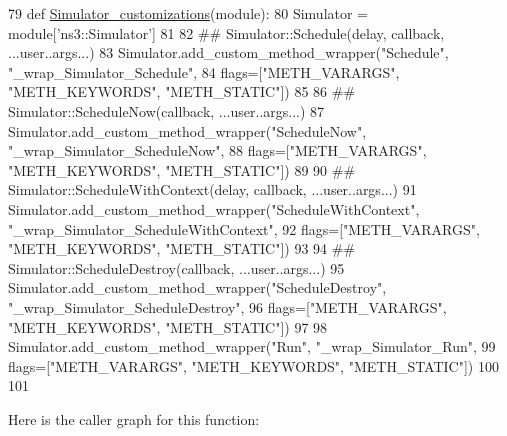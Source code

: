 \begin{DoxyCode}
79 \textcolor{keyword}{def }\hyperlink{namespacemodulegen__customizations_afb127c0333e2c1a8f1df9e5d0970ceea}{Simulator\_customizations}(module):
80     Simulator = module[\textcolor{stringliteral}{'ns3::Simulator'}]
81 
82     \textcolor{comment}{## Simulator::Schedule(delay, callback, ...user..args...)}
83     Simulator.add\_custom\_method\_wrapper(\textcolor{stringliteral}{"Schedule"}, \textcolor{stringliteral}{"\_wrap\_Simulator\_Schedule"},
84                                         flags=[\textcolor{stringliteral}{"METH\_VARARGS"}, \textcolor{stringliteral}{"METH\_KEYWORDS"}, \textcolor{stringliteral}{"METH\_STATIC"}])
85 
86     \textcolor{comment}{## Simulator::ScheduleNow(callback, ...user..args...)}
87     Simulator.add\_custom\_method\_wrapper(\textcolor{stringliteral}{"ScheduleNow"}, \textcolor{stringliteral}{"\_wrap\_Simulator\_ScheduleNow"},
88                                         flags=[\textcolor{stringliteral}{"METH\_VARARGS"}, \textcolor{stringliteral}{"METH\_KEYWORDS"}, \textcolor{stringliteral}{"METH\_STATIC"}])
89 
90     \textcolor{comment}{## Simulator::ScheduleWithContext(delay, callback, ...user..args...)}
91     Simulator.add\_custom\_method\_wrapper(\textcolor{stringliteral}{"ScheduleWithContext"}, \textcolor{stringliteral}{"\_wrap\_Simulator\_ScheduleWithContext"},
92                                         flags=[\textcolor{stringliteral}{"METH\_VARARGS"}, \textcolor{stringliteral}{"METH\_KEYWORDS"}, \textcolor{stringliteral}{"METH\_STATIC"}])
93 
94     \textcolor{comment}{## Simulator::ScheduleDestroy(callback, ...user..args...)}
95     Simulator.add\_custom\_method\_wrapper(\textcolor{stringliteral}{"ScheduleDestroy"}, \textcolor{stringliteral}{"\_wrap\_Simulator\_ScheduleDestroy"},
96                                         flags=[\textcolor{stringliteral}{"METH\_VARARGS"}, \textcolor{stringliteral}{"METH\_KEYWORDS"}, \textcolor{stringliteral}{"METH\_STATIC"}])
97 
98     Simulator.add\_custom\_method\_wrapper(\textcolor{stringliteral}{"Run"}, \textcolor{stringliteral}{"\_wrap\_Simulator\_Run"},
99                                         flags=[\textcolor{stringliteral}{"METH\_VARARGS"}, \textcolor{stringliteral}{"METH\_KEYWORDS"}, \textcolor{stringliteral}{"METH\_STATIC"}])
100 
101 
\end{DoxyCode}


Here is the caller graph for this function\+:


